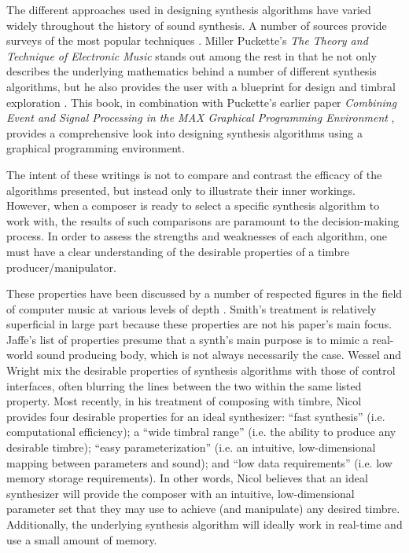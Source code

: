 \documentclass[a4paper,12pt]{report} 	%
\numberwithin{figure}{chapter}
\numberwithin{table}{chapter}
\numberwithin{equation}{chapter}
\begin{document}
\begin{flushleft}
The different approaches used in designing synthesis algorithms have varied widely throughout the history of sound synthesis. A number of sources provide surveys of the most popular techniques \cite{Roads:NotRead, Miranda:NotRead, Cook:NotRead}. Miller Puckette's \emph{The Theory and Technique of Electronic Music} stands out among the rest in that he not only describes the underlying mathematics behind a number of different synthesis algorithms, but he also provides the user with a blueprint for design and timbral exploration \cite{Puckette:2007ai}. This book, in combination with Puckette's earlier paper \emph{Combining Event and Signal Processing in the MAX Graphical Programming Environment} \cite{Puckette:NoRead2}, provides a comprehensive look into designing synthesis algorithms using a graphical programming environment. 

The intent of these writings is not to compare and contrast the efficacy of the algorithms presented, but instead only to illustrate their inner workings. However, when a composer is ready to select a specific synthesis algorithm to work with, the results of such comparisons are paramount to the decision-making process. In order to assess the strengths and weaknesses of each algorithm, one must have a clear understanding of the desirable properties of a timbre producer/manipulator.

These properties have been discussed by a number of respected figures in the field of computer music at various levels of depth \cite{III:1991hc, Wessel:2002uk, Jaffe:1995fv}. Smith's treatment is relatively superficial in large part because these properties are not his paper's main focus. Jaffe's list of properties presume that a synth's main purpose is to mimic a real-world sound producing body, which is not always necessarily the case. Wessel and Wright mix the desirable properties of synthesis algorithms with those of control interfaces, often blurring the lines between the two within the same listed property. Most recently, in his treatment of composing with timbre, Nicol \cite[p. 40]{Nicol:2005rp} provides four desirable properties for an ideal synthesizer: ``fast synthesis'' (i.e. computational efficiency); a ``wide timbral range'' (i.e. the ability to produce any desirable timbre); ``easy parameterization'' (i.e. an intuitive, low-dimensional mapping between parameters and sound); and ``low data requirements'' (i.e. low memory storage requirements). In other words, Nicol believes that an ideal synthesizer will provide the composer with an intuitive, low-dimensional parameter set that they may use to achieve (and manipulate) any desired timbre. Additionally, the underlying synthesis algorithm will ideally work in real-time and use a small amount of memory.


\end{flushleft}
\end{document}
